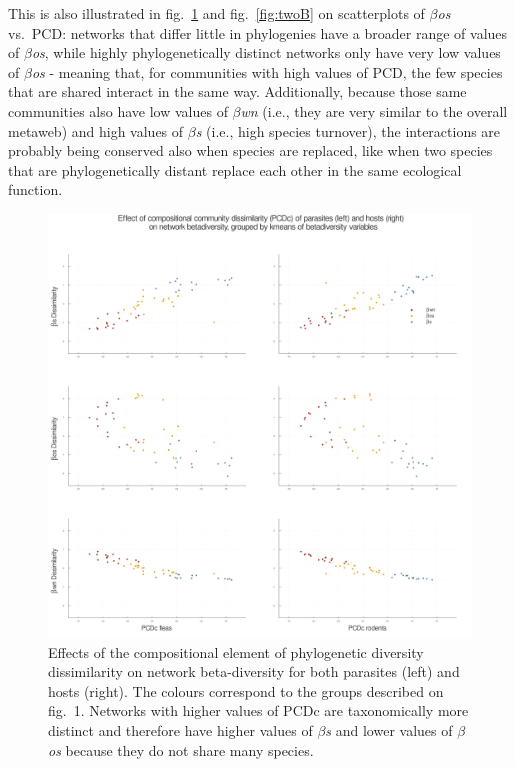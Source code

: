 \documentclass[12pt]{article}
\makeatletter
\def\maxwidth{\ifdim\Gin@nat@width>\linewidth\linewidth
\else\Gin@nat@width\fi}
\let\Oldincludegraphics\includegraphics
\renewcommand{\includegraphics}[1]{\Oldincludegraphics[width=\maxwidth]{#1}}
\makeatother
\begin{document}
This is also illustrated in fig.~\ref{fig:twoA} and fig.~\ref{fig:twoB}
on scatterplots of \emph{\(\beta\)os} vs.~PCD: networks that differ
little in phylogenies have a broader range of values of
\emph{\(\beta\)os}, while highly phylogenetically distinct networks only
have very low values of \emph{\(\beta\)os} - meaning that, for
communities with high values of PCD, the few species that are shared
interact in the same way. Additionally, because those same communities
also have low values of \emph{\(\beta\)wn} (i.e., they are very similar
to the overall metaweb) and high values of \emph{\(\beta\)s} (i.e., high
species turnover), the interactions are probably being conserved also
when species are replaced, like when two species that are
phylogenetically distant replace each other in the same ecological
function.

\begin{figure}
\hypertarget{fig:twoA}{%
\centering
\includegraphics{figures/fig2A.png}
\caption{Effects of the compositional element of phylogenetic diversity
dissimilarity on network beta-diversity for both parasites (left) and
hosts (right). The colours correspond to the groups described on fig.~1.
Networks with higher values of PCDc are taxonomically more distinct and
therefore have higher values of \emph{\(\beta\)s} and lower values of
\emph{\(\beta\)os} because they do not share many
species.}\label{fig:twoA}
}
\end{figure}
\end{document}
